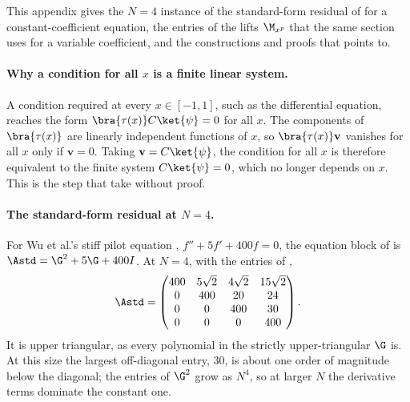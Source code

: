 This appendix gives the $N=4$ instance of the standard-form residual of  for a constant-coefficient equation, the entries of the lifts $\M_{x^p}$ that the same section uses for a variable coefficient, and the constructions and proofs that  points to.

\paragraph{Why a condition for all $x$ is a finite linear system.} \label{app:pihm-constraint-proof}A condition required at every $x\in[-1,1]$, such as the differential equation, reaches the form $\bra{\tau(x)}C\ket{\psi}=0$ for all $x$. The components of $\bra{\tau(x)}$ are linearly independent functions of $x$, so $\bra{\tau(x)}\mathbf{v}$ vanishes for all $x$ only if $\mathbf{v}=0$. Taking $\mathbf{v}=C\ket{\psi}$, the condition for all $x$ is therefore equivalent to the finite system $C\ket{\psi}=0$, which no longer depends on $x$. This is the step that  take without proof.

\paragraph{The standard-form residual at $N=4$.} For Wu et al.'s stiff pilot equation \cite{wu2025pihm}, $f'' + 5f' + 400f = 0$, the equation block of  is $\Astd = \G^{2} + 5\G + 400I$. At $N=4$, with the entries of ,
\begin{equation}
    \Astd =
    \begin{pmatrix}
        400 & 5\sqrt{2} & 4\sqrt{2} & 15\sqrt{2} \\
        0 & 400 & 20 & 24 \\
        0 & 0 & 400 & 30 \\
        0 & 0 & 0 & 400
    \end{pmatrix}.
    \label{eq:app-standard-example}
\end{equation}
It is upper triangular, as every polynomial in the strictly upper-triangular $\G$ is. At this size the largest off-diagonal entry, $30$, is about one order of magnitude below the diagonal; the entries of $\G^2$ grow as $N^4$, so at larger $N$ the derivative terms dominate the constant one.


